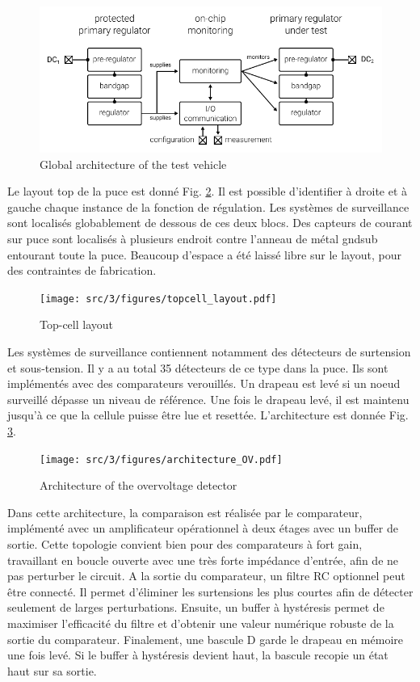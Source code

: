 \begin{figure}[h]
  \centering
  \includegraphics{src/1/figures/architecture_testchip.pdf}
  \caption{Global architecture of the test vehicle}
  \label{architecture_testchip}
\end{figure}

Le layout top de la puce est donné Fig. \ref{fig:top-cell-layout}.
Il est possible d'identifier à droite et à gauche chaque instance de la fonction de régulation.
Les systèmes de surveillance sont localisés globablement de dessous de ces deux blocs.
Des capteurs de courant sur puce sont localisés à plusieurs endroit contre l'anneau de métal gndsub entourant toute la puce.
Beaucoup d'espace a été laissé libre sur le layout, pour des contraintes de fabrication.

\begin{figure}[!h]
  \centering
  \texttt{[image: src/3/figures/topcell\_layout.pdf]}
  \caption{Top-cell layout}
  \label{fig:top-cell-layout}
\end{figure}

Les systèmes de surveillance contiennent notamment des détecteurs de surtension et sous-tension.
Il y a au total 35 détecteurs de ce type dans la puce.
Ils sont implémentés avec des comparateurs verouillés.
Un drapeau est levé si un noeud surveillé dépasse un niveau de référence.
Une fois le drapeau levé, il est maintenu jusqu'à ce que la cellule puisse être lue et resettée.
L'architecture est donnée Fig. \ref{fig:architecture-ov}.

\begin{figure}[!h]
  \centering
  \texttt{[image: src/3/figures/architecture\_OV.pdf]}
  \caption{Architecture of the overvoltage detector}
  \label{fig:architecture-ov}
\end{figure}

Dans cette architecture, la comparaison est réalisée par le comparateur, implémenté avec un amplificateur opérationnel à deux étages avec un buffer de sortie.
Cette topologie convient bien pour des comparateurs à fort gain, travaillant en boucle ouverte avec une très forte impédance d'entrée, afin de ne pas perturber le circuit.
A la sortie du comparateur, un filtre RC optionnel peut être connecté.
Il permet d'éliminer les surtensions les plus courtes afin de détecter seulement de larges perturbations.
Ensuite, un buffer à hystéresis permet de maximiser l'efficacité du filtre et d'obtenir une valeur numérique robuste de la sortie du comparateur.
Finalement, une bascule D garde le drapeau en mémoire une fois levé.
Si le buffer à hystéresis devient haut, la bascule recopie un état haut sur sa sortie.

